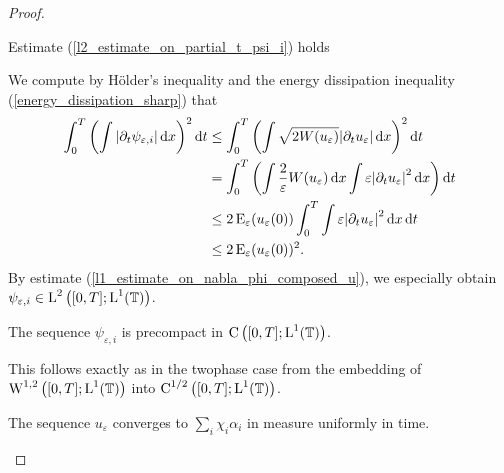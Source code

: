 \begin{proof}
	\begin{description}[wide=0pt]
		\item[Step 1:] Estimate (\ref{l2_estimate_on_partial_t_psi_i}) holds
		
		We compute by Hölder's inequality and the energy dissipation inequality 
		(\ref{energy_dissipation_sharp}) that
		\begin{align*}
			\int_{ 0 }^{ T }
				\left(
					\int
						\abs{ \partial_{ t } \psi_{ \varepsilon , i } }
					\dd{ x }
				\right)^{ 2 }
			\dd{ t }
			& \leq
			\int_{ 0 }^{ T }
				\left(
					\int
						\sqrt{ 2 W ( u_{ \varepsilon } ) }
						\abs{ \partial_{ t } u_{ \varepsilon } }
					\dd{ x }
				\right)^{ 2 }
			\dd{ t }
			\\
			& =
			\int_{ 0 }^{ T }
				\left(
				\int
					\frac{ 2 }{ \varepsilon }
					W ( u_{ \varepsilon } )
				\dd{ x }
				\int
					\varepsilon 
					\abs{ \partial_{ t } u_{ \varepsilon } }^{ 2 }
				\dd{ x }
				\right)
			\dd{ t }
			\\
			& \leq
			2 \operatorname{E}_{ \varepsilon } ( u_{ \varepsilon } ( 0 ) )
			\int_{ 0 }^{ T }
				\int
					\varepsilon 
					\abs{ \partial_{ t } u_{ \varepsilon } }^{ 2 }
				\dd{ x }
			\dd{ t }
			\\
			& \leq
			2 \operatorname{E}_{ \varepsilon } ( u_{ \varepsilon } ( 0 ) )^{ 2 }.
		\end{align*}
		By estimate (\ref{l1_estimate_on_nabla_phi_composed_u}), we especially 
		obtain $ \psi_{ \varepsilon , i } \in \operatorname{L}^{ 2 } \left( [ 0 , T ] ; 
		\operatorname{L}^{ 1 } ( \operatorname{\mathbb{T}} ) \right) $.
		
		\item[Step 2:] The sequence $ \psi_{ \varepsilon, i } $ is precompact 
		in $ \operatorname{C} \left( [ 0 , T ] ; \operatorname{L}^{ 1 } ( \operatorname{\mathbb{T}} ) \right) $.
		
		This follows exactly as in the twophase case from the embedding of 
		$ \operatorname{W}^{ 1 , 2 } \left( [ 0 , T ] ; \operatorname{L}^{ 1 } ( \operatorname{\mathbb{T}} ) \right) $
		into $ \operatorname{C}^{ 1/2 } \left( [ 0 , T ] ; \operatorname{L}^{ 1 } ( \operatorname{\mathbb{T}} ) \right) $.
		
		\item[Step 3:] The sequence $ u_{ \varepsilon } $ converges to $ \sum_{ 
		i } \chi_{ i } \alpha_{ i } $ in measure uniformly in time.
		

\end{description}
\end{proof}
